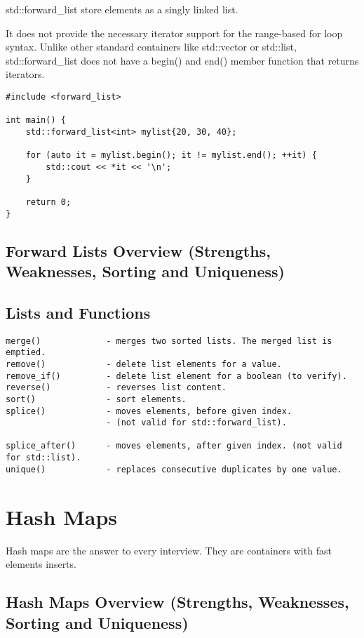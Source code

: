std::forward\_list store elements as a singly linked list.

It does not provide the necessary iterator support for the range-based for loop syntax.
Unlike other standard containers like std::vector or std::list,
std::forward\_list does not have a begin() and end() member function that returns iterators.

\begin{verbatim}
#include <forward_list>

int main() {
    std::forward_list<int> mylist{20, 30, 40};

    for (auto it = mylist.begin(); it != mylist.end(); ++it) {
        std::cout << *it << '\n';
    }

    return 0;
}
\end{verbatim}

\subsection{Forward Lists Overview (Strengths, Weaknesses, Sorting and Uniqueness)}

\subsection{Lists and Functions}

\begin{verbatim}
merge()             - merges two sorted lists. The merged list is emptied.
remove()            - delete list elements for a value.
remove_if()         - delete list element for a boolean (to verify).
reverse()           - reverses list content.
sort()              - sort elements.
splice()            - moves elements, before given index.
                    - (not valid for std::forward_list).

splice_after()      - moves elements, after given index. (not valid for std::list).
unique()            - replaces consecutive duplicates by one value.
\end{verbatim}

\section{Hash Maps}

Hash maps are the answer to every interview. They are containers with fast elements inserts.

\subsection{Hash Maps Overview (Strengths, Weaknesses, Sorting and Uniqueness)}

